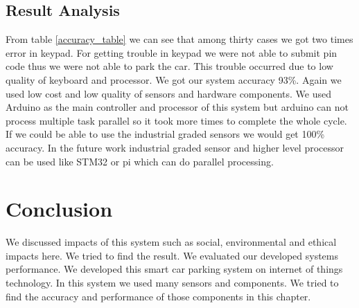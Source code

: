 \subsection{Result Analysis}
From table \ref{accuracy_table} we can see that among thirty cases we got two times error in keypad. For getting trouble in keypad we were not able to submit pin code thus we were not able to park the car. This trouble occurred due to low quality of keyboard and processor. We got our system accuracy 93\%. Again we used low cost and low quality of sensors and hardware components. We used Arduino as the main controller and processor of this system but arduino can not process multiple task parallel so it took more times to complete the whole cycle. If we could be able to use the industrial graded sensors we would get 100\% accuracy. In the future work industrial graded sensor and higher level processor can be used like STM32 or pi which can do parallel processing.

\section{Conclusion}
We discussed impacts of this system such as social, environmental and ethical impacts here. We tried to find the result. We evaluated our developed systems performance. We developed this smart car parking system on internet of things technology. In this system we used many sensors and components. We tried to find the accuracy and performance of those components in this chapter.